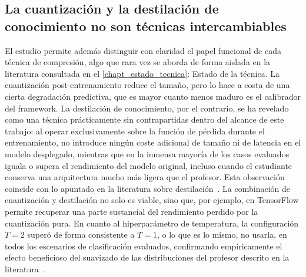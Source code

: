\documentclass[a4paper,12pt,twoside,final]{book}
\begin{document}
\subsection{La cuantización y la destilación de conocimiento no son técnicas intercambiables}
El estudio permite además distinguir con claridad el papel funcional de cada técnica de compresión, algo que rara vez
se aborda de forma aislada en la literatura consultada en el \autoref{chapt_estado_tecnica}: Estado de la técnica. La
cuantización post-entrenamiento reduce el tamaño, pero lo hace a costa de una cierta degradación predictiva, que es
mayor cuanto menos maduro es el calibrador del framework. La destilación de conocimiento, por el contrario, se ha
revelado como una técnica prácticamente sin contrapartidas dentro del alcance de este trabajo: al operar exclusivamente
sobre la función de pérdida durante el entrenamiento, no introduce ningún coste adicional de tamaño ni de latencia en el
modelo desplegado, mientras que en la inmensa mayoría de los casos evaluados iguala o supera el rendimiento del modelo
original, incluso cuando el estudiante conserva una arquitectura mucho más ligera que el profesor. Esta observación
coincide con lo apuntado en la literatura sobre destilación~\cite{gou2021ijcv}. La combinación de cuantización y
destilación no solo es viable, sino que, por ejemplo, en TensorFlow permite recuperar una parte sustancial del
rendimiento perdido por la cuantización pura. En cuanto al hiperparámetro de temperatura, la configuración $T=2$ superó
de forma consistente a $T=1$, o lo que es lo mismo, no usarla, en todos los escenarios de clasificación evaluados,
confirmando empíricamente el efecto beneficioso del suavizado de las distribuciones del profesor descrito en la
literatura~\cite{xu2023ieecomst}.
 
\end{document}
